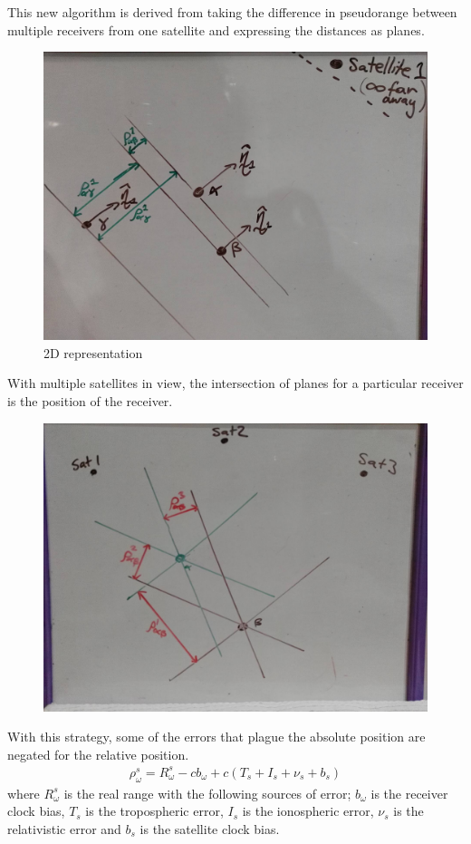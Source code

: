 This new algorithm is derived from taking the difference in pseudorange between multiple receivers from one satellite and expressing the distances as planes.
\begin{figure}[h]
\centering
\caption{2D representation}
\label{fig:overall_singleS_multiR}
\includegraphics[width=0.7\linewidth]{ChapterLiteratureReview/overall_singleS_multiR.jpg}
\end{figure}

With multiple satellites in view, the intersection of planes for a particular receiver is the position of the receiver.
\begin{figure}[h]
\centering
\caption{}
\label{fig:overall_multiS_duelR}
\includegraphics[width=0.7\linewidth]{ChapterLiteratureReview/overall_multiS_duelR.jpg}
\end{figure}

With this strategy, some of the errors that plague the absolute position are negated for the relative position. 
\begin{eqnarray}
\rho_\omega^s = R_\omega^s -cb_\omega + c(T_s + I_s+\nu_s+b_s)
\end{eqnarray}
where $R_\omega^s$ is the real range with the following sources of error; $b_\omega$ is the receiver clock bias, $T_s$ is the tropospheric error, $I_s$ is the ionospheric error, $\nu_s$ is the relativistic error and $b_s$ is the satellite clock bias.




